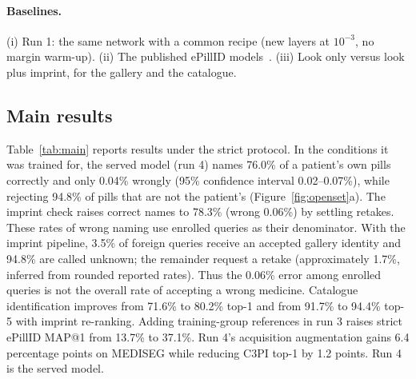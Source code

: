 \paragraph{Baselines.} (i) Run 1: the same network with a common recipe (new layers at $10^{-3}$, no margin
warm-up). (ii) The published ePillID models~\citep{usuyama2020epillid}. (iii) Look only versus look plus imprint, for
the gallery and the catalogue.

\subsection{Main results}
\label{sec:main}

Table~\ref{tab:main} reports results under the strict protocol. In the conditions
it was trained for, the served model (run 4) names 76.0\% of a patient's own pills correctly and only 0.04\% wrongly
(95\% confidence interval 0.02--0.07\%), while rejecting 94.8\% of pills that are not the patient's (Figure~\ref{fig:openset}a). The
imprint check raises correct names to 78.3\% (wrong 0.06\%) by settling retakes. These rates of wrong naming use enrolled queries as their denominator. With the imprint
pipeline, 3.5\% of foreign queries receive an accepted gallery identity and 94.8\% are called unknown;
the remainder request a retake (approximately 1.7\%, inferred from rounded reported rates). Thus the
0.06\% error among enrolled queries is not the overall rate of accepting a wrong medicine. Catalogue identification improves from 71.6\% to 80.2\% top-1 and from 91.7\% to 94.4\% top-5 with imprint re-ranking. Adding training-group references in run 3 raises strict ePillID MAP@1 from 13.7\% to 37.1\%. Run 4's acquisition augmentation gains 6.4 percentage points on MEDISEG while reducing C3PI top-1 by 1.2 points. Run 4 is the served model.

